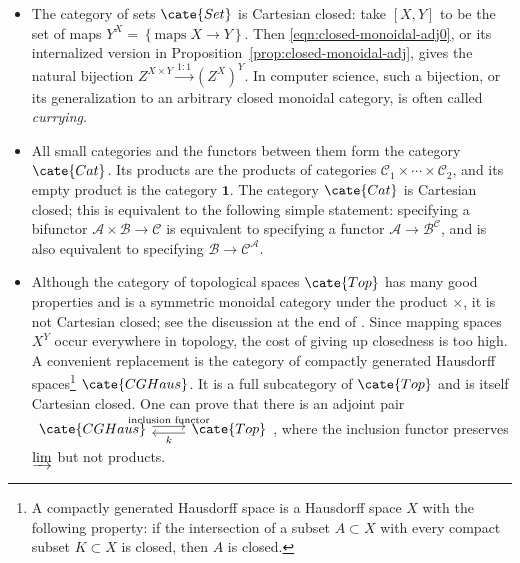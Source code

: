 \begin{itemize}
	\item The category of sets $\cate{Set}$ is Cartesian closed: take $[X,Y]$
	to be the set of maps
	$Y^X=\left\{\text{maps}\;X\to Y\right\}$. Then
	\eqref{eqn:closed-monoidal-adj0}, or its internalized version in
	Proposition~\ref{prop:closed-monoidal-adj}, gives the natural bijection
	$Z^{X\times Y}\xrightarrow{1:1}(Z^X)^Y$. In computer science, such a
	bijection, or its generalization to an arbitrary closed monoidal category,
	is often called \emph{currying}.

	\item All small categories and the functors between them form the category
	$\cate{Cat}$. Its products are the products of categories
	$\mathcal{C}_1\times\cdots\times\mathcal{C}_2$, and its empty product is
	the category $\mathbf{1}$. The category $\cate{Cat}$ is Cartesian closed;
	this is equivalent to the following simple statement: specifying a
	bifunctor $\mathcal{A}\times\mathcal{B}\to\mathcal{C}$ is equivalent to
	specifying a functor $\mathcal{A}\to\mathcal{B}^{\mathcal{C}}$, and is
	also equivalent to specifying $\mathcal{B}\to\mathcal{C}^{\mathcal{A}}$.

	\item Although the category of topological spaces $\cate{Top}$ has many
	good properties and is a symmetric monoidal category under the product
	$\times$, it is not Cartesian closed; see the discussion at the end of
	\cite[\S 1.5]{Kel05}. Since mapping spaces $X^Y$ occur everywhere in
	topology, the cost of giving up closedness is too high. A convenient
	replacement is the category of compactly generated Hausdorff
	spaces\footnote{A compactly generated Hausdorff space is a Hausdorff space
	$X$ with the following property: if the intersection of a subset
	$A\subset X$ with every compact subset $K\subset X$ is closed, then $A$
	is closed.} $\cate{CGHaus}$. It is a full subcategory of $\cate{Top}$ and
	is itself Cartesian closed. One can prove that there is an adjoint pair
	$\begin{tikzcd}
		\cate{CGHaus} \arrow[shift left, r, "\text{inclusion functor}"] & \cate{Top} \arrow[shift left, l, "k"]
	\end{tikzcd}$,
	where the inclusion functor preserves $\varinjlim$ but not products.


\end{itemize}
